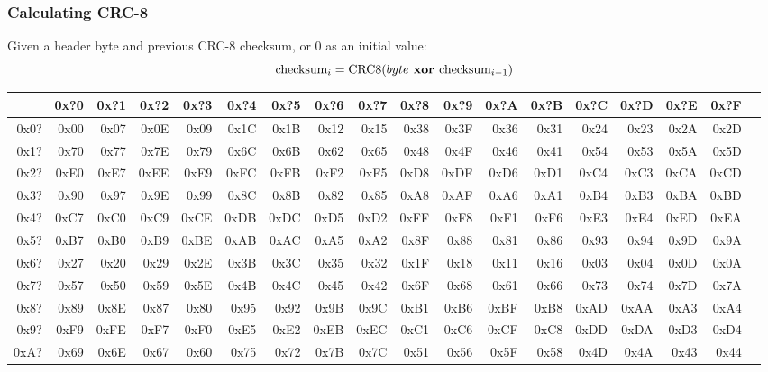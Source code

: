\clearpage

\subsubsection{Calculating CRC-8}
Given a header byte and previous CRC-8 checksum,
or 0 as an initial value:
\begin{equation*}
\text{checksum}_i = \text{CRC8}(byte\textbf{ xor }\text{checksum}_{i - 1})
\end{equation*}
\begin{table}[h]
{\ttfamily
\begin{tabular}{|r||r|r|r|r|r|r|r|r|r|r|r|r|r|r|r|r|r|}
\hline
 & 0x?0 & 0x?1 & 0x?2 & 0x?3 & 0x?4 & 0x?5 & 0x?6 & 0x?7 & 0x?8 & 0x?9 & 0x?A & 0x?B & 0x?C & 0x?D & 0x?E & 0x?F \\
\hline
0x0? & 0x00 & 0x07 & 0x0E & 0x09 & 0x1C & 0x1B & 0x12 & 0x15 & 0x38 & 0x3F & 0x36 & 0x31 & 0x24 & 0x23 & 0x2A & 0x2D \\
0x1? & 0x70 & 0x77 & 0x7E & 0x79 & 0x6C & 0x6B & 0x62 & 0x65 & 0x48 & 0x4F & 0x46 & 0x41 & 0x54 & 0x53 & 0x5A & 0x5D \\
0x2? & 0xE0 & 0xE7 & 0xEE & 0xE9 & 0xFC & 0xFB & 0xF2 & 0xF5 & 0xD8 & 0xDF & 0xD6 & 0xD1 & 0xC4 & 0xC3 & 0xCA & 0xCD \\
0x3? & 0x90 & 0x97 & 0x9E & 0x99 & 0x8C & 0x8B & 0x82 & 0x85 & 0xA8 & 0xAF & 0xA6 & 0xA1 & 0xB4 & 0xB3 & 0xBA & 0xBD \\
0x4? & 0xC7 & 0xC0 & 0xC9 & 0xCE & 0xDB & 0xDC & 0xD5 & 0xD2 & 0xFF & 0xF8 & 0xF1 & 0xF6 & 0xE3 & 0xE4 & 0xED & 0xEA \\
0x5? & 0xB7 & 0xB0 & 0xB9 & 0xBE & 0xAB & 0xAC & 0xA5 & 0xA2 & 0x8F & 0x88 & 0x81 & 0x86 & 0x93 & 0x94 & 0x9D & 0x9A \\
0x6? & 0x27 & 0x20 & 0x29 & 0x2E & 0x3B & 0x3C & 0x35 & 0x32 & 0x1F & 0x18 & 0x11 & 0x16 & 0x03 & 0x04 & 0x0D & 0x0A \\
0x7? & 0x57 & 0x50 & 0x59 & 0x5E & 0x4B & 0x4C & 0x45 & 0x42 & 0x6F & 0x68 & 0x61 & 0x66 & 0x73 & 0x74 & 0x7D & 0x7A \\
0x8? & 0x89 & 0x8E & 0x87 & 0x80 & 0x95 & 0x92 & 0x9B & 0x9C & 0xB1 & 0xB6 & 0xBF & 0xB8 & 0xAD & 0xAA & 0xA3 & 0xA4 \\
0x9? & 0xF9 & 0xFE & 0xF7 & 0xF0 & 0xE5 & 0xE2 & 0xEB & 0xEC & 0xC1 & 0xC6 & 0xCF & 0xC8 & 0xDD & 0xDA & 0xD3 & 0xD4 \\
0xA? & 0x69 & 0x6E & 0x67 & 0x60 & 0x75 & 0x72 & 0x7B & 0x7C & 0x51 & 0x56 & 0x5F & 0x58 & 0x4D & 0x4A & 0x43 & 0x44 \\

\end{tabular}}
\end{table}
